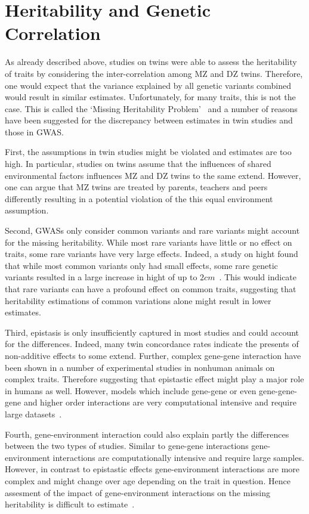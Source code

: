 \documentclass[../header.tex]{subfiles}
\begin{document}
\section{Heritability and Genetic Correlation}
\label{sec:heritability_and_genetic_correlation}

As already described above, studies on twins were able to assess the heritability of traits by considering the inter-correlation among MZ and DZ twins.
Therefore, one would expect that the variance explained by all genetic variants combined would result in similar estimates.
Unfortunately, for many traits, this is not the case.
This is called the `Missing Heritability Problem'~\cite{Vineis2010} and a  number of reasons have been suggested for the discrepancy between estimates in twin studies and those in GWAS\@.

First, the assumptions in twin studies might be violated and estimates are too high.
In particular, studies on twins assume that the influences of shared environmental factors influences MZ and DZ twins to the same extend.
However, one can argue that MZ twins are treated by parents, teachers and peers differently resulting in a potential violation of the this equal environment assumption. 

Second, GWASs only consider common variants and rare variants might account for the missing heritability.
While most rare variants have little or no effect on traits, some rare variants have very large effects.
Indeed, a study on hight found that while most common variants only had small effects, some rare genetic variants resulted in a large increase in hight of up to $2cm$~\cite{Marouli2017}.
This would indicate that rare variants can have a profound effect on common traits, suggesting that heritability estimations of common variations alone might result in lower estimates.

Third, epistasis is only insufficiently captured in most studies and could account for the differences.
Indeed, many twin concordance rates indicate the presents of non-additive effects to some extend.
Further, complex gene-gene interaction have been shown in a number of experimental studies in nonhuman animals on complex traits.
Therefore suggesting that epistastic effect might play a major role in humans as well.
However, models which include gene-gene or even gene-gene-gene and higher order interactions are very computational intensive and require large datasets~\cite{Lippert2013}. 

Fourth, gene-environment interaction could also explain partly the differences between the two types of studies.
Similar to gene-gene interactions gene-environment interactions are computationally intensive and require large samples.
However, in contrast to epistastic effects gene-environment interactions are more complex and might change over age depending on the trait in question.
Hence assesment of the impact of gene-environment interactions on the missing heritability is difficult to estimate~\cite{Do2016,Kaprio2012}.
\end{document}
